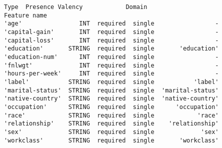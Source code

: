 \documentclass[11pt]{article}
\begin{document}
    
    
    \begin{Verbatim}[commandchars=\\\{\}]
                    Type  Presence Valency            Domain
Feature name                                                
'age'                INT  required  single                 -
'capital-gain'       INT  required  single                 -
'capital-loss'       INT  required  single                 -
'education'       STRING  required  single       'education'
'education-num'      INT  required  single                 -
'fnlwgt'             INT  required  single                 -
'hours-per-week'     INT  required  single                 -
'label'           STRING  required  single           'label'
'marital-status'  STRING  required  single  'marital-status'
'native-country'  STRING  required  single  'native-country'
'occupation'      STRING  required  single      'occupation'
'race'            STRING  required  single            'race'
'relationship'    STRING  required  single    'relationship'
'sex'             STRING  required  single             'sex'
'workclass'       STRING  required  single       'workclass'
    \end{Verbatim}

    
    
\end{document}
